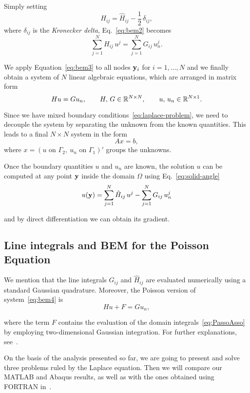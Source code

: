 Simply setting 
\begin{equation*}
H_{ij}=\hat{H}_{ij}-\frac{1}{2}\,\delta_{ij},
\end{equation*}
where $\delta_{ij}$ is the \emph{Kronecker delta}, Eq.~\eqref{eq:bem2} becomes
\begin{equation}
\label{eq:bem3}
\sum_{j=1}^N H_{ij}\,u^j=\sum_{j=1}^N G_{ij}\,u^j_n.
\end{equation}

We apply Equation~\eqref{eq:bem3} to all nodes $\mathbf{y}_i$ for $i=1,\dots,N$ and we finally obtain a system of $N$ linear algebraic equations, which are arranged in matrix form
\begin{equation}
\label{eq:bem4}
Hu=Gu_n,\qquad H,\,G\in\mathbb{R}^{N\times N},\qquad u,\,u_n\in\mathbb{R}^{N\times 1}.
\end{equation}

Since we have mixed boundary conditions~\eqref{eq:laplace-problem}, we need to decouple the system by separating the unknown from the known quantities. This leads to a final $N \times N$ system in the form 
\begin{equation}
\label{eq:finalAx=b}
Ax=b, 
\end{equation}
where $x=(u\text{ on }\Gamma_2,\ u_n\text{ on }\Gamma_1)'$ groups the unknowns.

Once the boundary quantities $u$ and $u_n$ are known, the solution $u$ can be computed at any point $\mathbf{y}$ inside the domain $\Omega$ using Eq.~\eqref{eq:solid-angle}
\begin{equation}
u(\mathbf{y})=\sum_{j=1}^N \hat{H}_{ij}\,u^j-\sum_{j=1}^N G_{ij}\,u^j_n
\end{equation}

and by direct differentiation we can obtain its gradient.

\subsection{Line integrals and BEM for the Poisson Equation}
\label{sub:line_integrals_and}%

We mention that the line integrals $G_{ij}$ and $\hat{H}_{ij}$ are evaluated numerically using a standard Gaussian quadrature. Moreover, the Poisson version of system~\eqref{eq:bem4} is
\begin{equation}
\label{eq:bem5}
Hu+F=Gu_n,
\end{equation}

where the term $F$ contains the evaluation of the domain integrals~\eqref{eq:PassoAsso} by employing two-dimensional Gaussian integration. For further explanations, see~\cite{sbemKatsi}.

\bigskip

\bigskip

On the basis of the analysis presented so far, we are going to present and solve three problems ruled by the Laplace equation. Then we will compare our MATLAB and Abaqus results, as well as with the ones obtained using FORTRAN in~\cite{sbemKatsi}. 

\newpage







